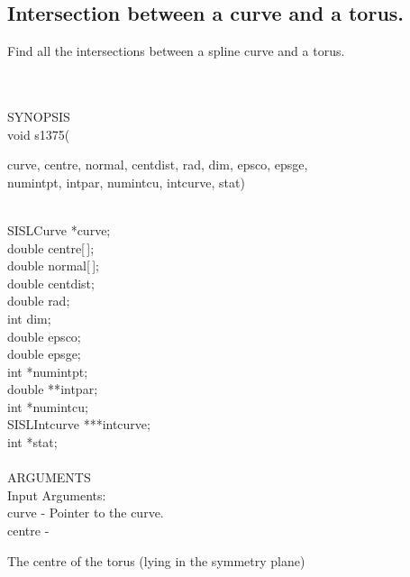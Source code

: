 \subsection{Intersection between a curve and a torus.}
\begin{minipg1}
  Find all the intersections between a spline curve and a torus.
\end{minipg1} \\ \\
SYNOPSIS\\
        \>void s1375(\begin{minipg3}
        {\fov curve}, {\fov centre}, {\fov normal}, {\fov centdist}, {\fov rad}, {\fov dim}, {\fov epsco}, {\fov epsge},\\ {\fov numintpt}, {\fov intpar},
                        {\fov numintcu}, {\fov intcurve}, {\fov stat})
                \end{minipg3}\\[0.3ex]
                \>\>    SISLCurve       \>      *{\fov curve};\\
                \>\>    double  \>      {\fov centre[\,]};\\
                \>\>    double  \>      {\fov normal}[\,];\\
                \>\>    double  \>      {\fov centdist};\\
                \>\>    double  \>      {\fov rad};\\
                \>\>    int             \>      {\fov dim};\\
                \>\>    double  \>      {\fov epsco};\\
                \>\>    double  \>      {\fov epsge};\\
                \>\>    int     \>      *{\fov numintpt};\\
                \>\>    double  \>      **{\fov intpar};\\
                \>\>    int     \>      *{\fov numintcu};\\
                \>\>    SISLIntcurve \> ***{\fov intcurve};\\
                \>\>    int     \>      *{\fov stat};\\
\\
ARGUMENTS\\
        \>Input Arguments:\\
        \>\>    {\fov curve}    \> - \> Pointer to the curve.\\
        \>\>    {\fov centre}   \> - \> \begin{minipg2}
                                The centre of the torus (lying in the symmetry plane)
                                \end{minipg2}\\[0.3ex]
